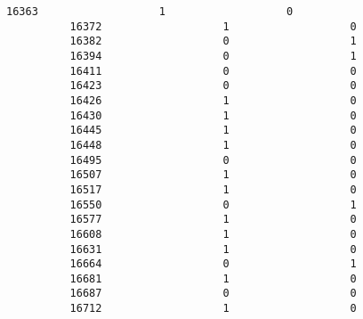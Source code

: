 \documentclass[11pt]{article}
\begin{document}
\begin{Verbatim}[commandchars=\\\{\}]
          16363                   1                   0   
          16372                   1                   0   
          16382                   0                   1   
          16394                   0                   1   
          16411                   0                   0   
          16423                   0                   0   
          16426                   1                   0   
          16430                   1                   0   
          16445                   1                   0   
          16448                   1                   0   
          16495                   0                   0   
          16507                   1                   0   
          16517                   1                   0   
          16550                   0                   1   
          16577                   1                   0   
          16608                   1                   0   
          16631                   1                   0   
          16664                   0                   1   
          16681                   1                   0   
          16687                   0                   0   
          16712                   1                   0   
          

\end{Verbatim}
\end{document}

